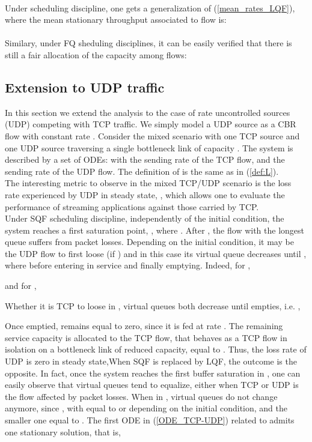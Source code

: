 \documentclass[a4paper,oneside, 11pt]{article}
\begin{document}
\\Under  scheduling discipline, one gets a generalization of (\ref{mean_rates_LQF}), where the mean stationary throughput associated to flow  is:\\

\\Similary, under FQ sheduling disciplines, it can be easily verified that there is still a fair allocation of the capacity  among flows:\\

\subsection{Extension to UDP traffic}\label{sec:UDP}
In this section we extend the analysis to the case of rate uncontrolled sources (UDP)
competing with TCP traffic. We simply model a UDP source as a CBR flow
with constant rate .
Consider the mixed scenario with one TCP source and one UDP source traversing a single bottleneck link
of capacity . The system is described by a set of ODEs:
with  the sending rate of the TCP flow, and  the sending rate of the UDP flow.
The definition of  is the same as in (\ref{def:L}).\\
The interesting metric to observe in the mixed TCP/UDP	 scenario is the loss rate experienced by UDP in steady state, ,
which allows one to evaluate the performance of streaming applications against those carried by TCP.\\
Under SQF scheduling discipline, independently of the initial condition, the system reaches a first saturation point, , where . After , the flow with the longest queue suffers from packet losses. Depending on the initial condition, it may be the UDP flow to first loose (if ) and in this case its virtual queue decreases until , where  before entering in service and finally emptying.
Indeed, for ,

and for ,

Whether it is TCP to loose in , virtual queues both decrease until  empties, i.e. ,

Once emptied,  remains equal to zero, since it is fed at rate .
The remaining service capacity  is allocated to the TCP flow, that behaves as a TCP flow in isolation on a bottleneck link of reduced capacity, equal to .
Thus, the loss rate of UDP is zero in steady state,When SQF is replaced by LQF, the outcome is the opposite. In fact, once the system reaches the first buffer saturation in , one can easily observe that virtual queues
tend to equalize, either when TCP or UDP is the flow affected by packet losses. When  in , virtual queues do not change anymore, since
, with  equal to  or  depending on the initial condition, and the
smaller one equal to .
The first ODE in (\ref{ODE_TCP-UDP}) related to  admits one stationary solution, that is,
\end{document}
